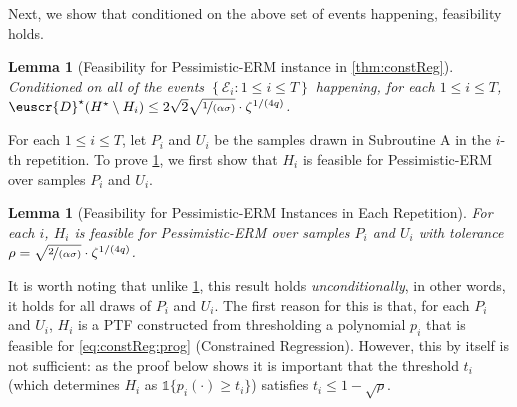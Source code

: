 \documentclass[11pt]{article}
\theoremstyle{plain}
\newtheorem{lemma}[theorem]{Lemma}
\theoremstyle{definition}
\theoremstyle{remark}
\newcommand{\sinbrace}[1]{\{#1\}}
\newcommand{\inbrace}[1]{\left\{#1\right\}}
\newcommand{\evE}{\ensuremath{\mathscr{E}}}
\newcommand{\nfrac}[2]{\nicefrac{#1}{#2}}
\newcommand{\customcal}[1]{\euscr{#1}}
\newcommand{\cD}{\customcal{D}}
\newcommand{\pERM}{Pessimistic-ERM}
\newcommand{\optset}{{H^\star}}
\newcommand{\cDtrue}{\cD^\star}
\begin{document}
            Next, we show that conditioned on the above set of events happening, feasibility holds.
            \begin{lemma}[{Feasibility for \pERM{} instance in \cref{thm:constReg}}]\label{lem:constReg:feasiblity}
                Conditioned on all of the events $\inbrace{\evE_i\colon 1\leq i\leq T}$ happening, for each $1\leq i\leq T$, $\cDtrue(\optset\setminus H_i)\leq 2\sqrt{2}\sqrt{\nfrac{1}{(\alpha\sigma)} }\cdot \zeta^{1/(4q)}$.
            \end{lemma}
            For each $1\leq i\leq T$, let $P_i$ and $U_i$ be the samples drawn in Subroutine A in the $i$-th repetition.
            To prove \cref{lem:constReg:feasiblity}, we first show that $H_i$ is feasible for \pERM{} over samples $P_i$ and $U_i$.

            \begin{lemma}[{Feasibility for \pERM{} Instances in Each Repetition}]\label{lem:constReg:feasibility:unconditional}
                For each $i$, $H_i$ is feasible for \pERM{} over samples $P_i$ and $U_i$ with tolerance $\rho=
                    \sqrt{\nfrac{2}{(\alpha\sigma)} }\cdot \zeta^{1/(4q)}
                $.
            \end{lemma}
            It is worth noting that unlike \cref{lem:constReg:feasiblity}, this result holds \textit{unconditionally}, in other words, it holds for all draws of $P_i$ and $U_i$.
            The first reason for this is that, for each $P_i$ and $U_i$, $H_i$ is a PTF constructed from thresholding a polynomial $p_i$ that is feasible for \cref{eq:constReg:prog} (Constrained Regression).
            However, this by itself is not sufficient: as the proof below shows it is important that the threshold $t_i$ (which determines $H_i$ as $\mathds{1}\sinbrace{p_i(\cdot)\geq t_i}$) satisfies $t_i\leq 1-\sqrt{\rho}$.
            
\end{document}
